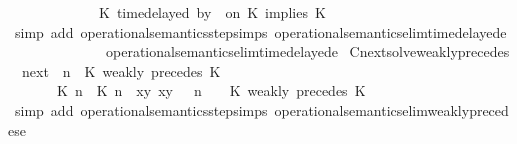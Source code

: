 \begin{isabellebody}
\ \ \ \ \ \ \ \ \ \ {\isasymturnstile}\ {\isasymPsi}\ {\isasymtriangleright}\ {\isacharparenleft}{\isacharparenleft}K\ time{\isacharminus}delayed\ by\ {\isasymdelta}{\isasymtau}\ on\ K\ implies\ K\ {\isacharhash}\ {\isasymPhi}{\isacharparenright}\ {\isacharbraceright}{\isacartoucheclose}\isanewline
%
\isadelimproof
%
\endisadelimproof
%
\isatagproof
{}\isamarkupfalse%
\ {\isacharparenleft}simp\ add{\isacharcolon}\ operational{\isacharunderscore}semantics{\isacharunderscore}step{\isachardot}simps\ operational{\isacharunderscore}semantics{\isacharunderscore}elim{\isachardot}timedelayed{\isacharunderscore}e{}\isanewline
\ \ \ \ \ \ \ \ \ \ \ \ \ \ operational{\isacharunderscore}semantics{\isacharunderscore}elim{\isachardot}timedelayed{\isacharunderscore}e{}{\isacharparenright}%
\endisatagproof
{\isafoldproof}%
%
\isadelimproof
\isanewline
%
\endisadelimproof
\isanewline
{}\isamarkupfalse%
\ Cnext{\isacharunderscore}solve{\isacharunderscore}weakly{\isacharunderscore}precedes{\isacharcolon}\isanewline
\ \ {\isacartoucheopen}{\isacharparenleft}{\isasymC}\isactrlsub n\isactrlsub e\isactrlsub x\isactrlsub t\ {\isacharparenleft}{\isasymGamma}{\isacharcomma}\ n\ {\isasymturnstile}\ {\isacharparenleft}{\isacharparenleft}K\ weakly\ precedes\ K\ {\isacharhash}\ {\isasymPsi}{\isacharparenright}\ {\isasymtriangleright}\ {\isasymPhi}{\isacharparenright}{\isacharparenright}\isanewline
\ \ \ \ {\isasymsupseteq}\ {\isacharbraceleft}\ {\isacharparenleft}{\isacharparenleft}{\isasymlceil}{\isacharhash}\isactrlsup {\isasymle}\ K\ n{\isacharcomma}\ {\isacharhash}\isactrlsup {\isasymle}\ K\ n{\isasymrceil}\ {\isasymin}\ {\isacharparenleft}{\isasymlambda}{\isacharparenleft}x{\isacharcomma}y{\isacharparenright}{\isachardot}\ x{\isasymle}y{\isacharparenright}{\isacharparenright}\ {\isacharhash}\ {\isasymGamma}{\isacharparenright}{\isacharcomma}\ n\ {\isasymturnstile}\ {\isasymPsi}\ {\isasymtriangleright}\ {\isacharparenleft}{\isacharparenleft}K\ weakly\ precedes\ K\ {\isacharhash}\ {\isasymPhi}{\isacharparenright}\ {\isacharbraceright}{\isacartoucheclose}\isanewline
%
\isadelimproof
%
\endisadelimproof
%
\isatagproof
{}\isamarkupfalse%
\ {\isacharparenleft}simp\ add{\isacharcolon}\ operational{\isacharunderscore}semantics{\isacharunderscore}step{\isachardot}simps\ operational{\isacharunderscore}semantics{\isacharunderscore}elim{\isachardot}weakly{\isacharunderscore}precedes{\isacharunderscore}e{\isacharparenright}%

\end{isabellebody}
